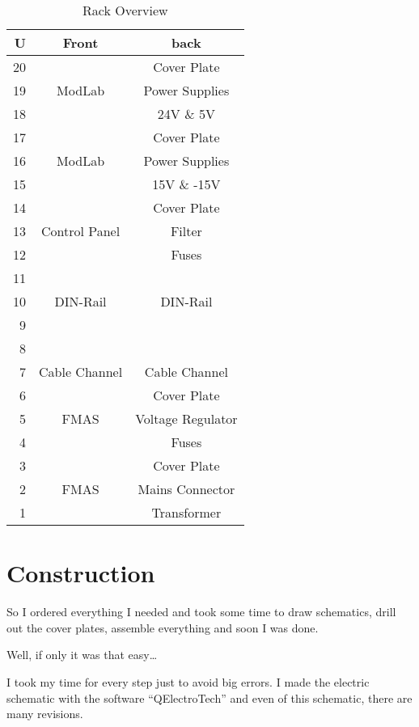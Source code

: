 \begin{table}[H]
\centering
\begin{tabular}{|r|c|c|}
\hline
\textbf{U}	&	\textbf{Front}	&	\textbf{back}		\\ \hline \hline
20	&			&	Cover Plate		    \\ \cline{1-1}
19	&	ModLab	&	Power Supplies		    \\ \cline{1-1}
18	&			&	24V \& 5V		    \\ \hline
17	&			&	Cover Plate		    \\ \cline{1-1}
16	&	ModLab	&	Power Supplies	    \\ \cline{1-1}
15	&			&	15V \& -15V	        \\ \hline
14	&			&	Cover Plate         \\ \cline{1-1}
13	&	Control Panel	&	Filter		\\ \cline{1-1}
12	&			&	Fuses			        \\ \hline
11	&	    	&	            		\\ \cline{1-1}
10	&	DIN-Rail	&	DIN-Rail		\\ \cline{1-1}
9	&	        &                   	\\ \cline{1-1}
8   &           &                       \\ \cline{1-1}
7	&	Cable Channel	&	Cable Channel		\\ \hline
6	&			&	Cover Plate		    \\ \cline{1-1}
5	&	FMAS	&	Voltage Regulator   \\ \cline{1-1}
4	&			&	Fuses	        \\ \hline
3	&			&	Cover Plate		    \\ \cline{1-1}
2	&	FMAS	&	Mains Connector	    \\ \cline{1-1}
1	&			&	Transformer			    \\ \hline

\end{tabular}
\caption{Rack Overview}
\label{tab:Rack Overview}
\end{table}

\section{Construction}
So I ordered everything I needed and took some time to draw schematics, drill out the cover plates, assemble everything and soon I was done.

Well, if only it was that easy\dots

I took my time for every step just to avoid big errors. I made the electric schematic with the software ``QElectroTech'' and even of this schematic, there are many revisions. 

